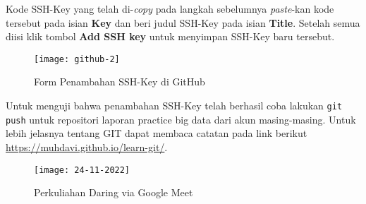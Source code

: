 \documentclass[a4paper]{tufte-handout}
\begin{document}
\begin{enumerate}
Kode SSH-Key yang telah di-\textit{copy} pada langkah sebelumnya \textit{paste}-kan kode tersebut pada isian \textbf{Key} dan beri judul SSH-Key pada isian \textbf{Title}. Setelah semua diisi klik tombol \textbf{Add SSH key} untuk menyimpan SSH-Key baru tersebut.

\begin{figure}[!ht]
\texttt{[image: github-2]}
\caption{Form Penambahan SSH-Key di GitHub}
\label{gam:tambah-ssh}
\end{figure}

Untuk menguji bahwa penambahan SSH-Key telah berhasil coba lakukan {\tt git push} untuk repositori laporan practice big data dari akun masing-masing. Untuk lebih jelasnya tentang GIT dapat membaca catatan pada link berikut \url{https://muhdavi.github.io/learn-git/}.
\end{enumerate}

\begin{figure}[!ht]
\texttt{[image: 24-11-2022]}
\caption{Perkuliahan Daring via Google Meet}
\label{gam:perkuliahan-24-11}
\end{figure}

\vspace*{-.5cm}
\hrulefill

\clearpage
{}

\end{document}
